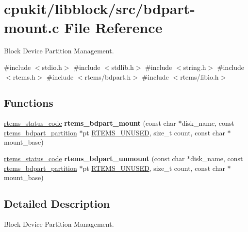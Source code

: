 \hypertarget{bdpart-mount_8c}{}\section{cpukit/libblock/src/bdpart-\/mount.c File Reference}
\label{bdpart-mount_8c}


Block Device Partition Management.  


{\ttfamily \#include $<$stdio.\+h$>$}\newline
{\ttfamily \#include $<$stdlib.\+h$>$}\newline
{\ttfamily \#include $<$string.\+h$>$}\newline
{\ttfamily \#include $<$rtems.\+h$>$}\newline
{\ttfamily \#include $<$rtems/bdpart.\+h$>$}\newline
{\ttfamily \#include $<$rtems/libio.\+h$>$}\newline
\subsection*{Functions}
\begin{DoxyCompactItemize}
\item 
\mbox{\label{bdpart-mount_8c_a652c94c1ca0ff28d1d81aef4ba893453}} 
\mbox{\hyperlink{group__ClassicStatus_ga545d41846817eaba6143d52ee4d9e9fe}{rtems\+\_\+status\+\_\+code}} {\bfseries rtems\+\_\+bdpart\+\_\+mount} (const char $\ast$disk\+\_\+name, const \mbox{\hyperlink{structrtems__bdpart__partition}{rtems\+\_\+bdpart\+\_\+partition}} $\ast$pt \mbox{\hyperlink{group__RTEMSScoreBaseDefs_ga6794c0ff237a90e837e19f9bbcae4297}{R\+T\+E\+M\+S\+\_\+\+U\+N\+U\+S\+ED}}, size\+\_\+t count, const char $\ast$mount\+\_\+base)
\item 
\mbox{\label{bdpart-mount_8c_ae3d25c086e88fbe6740f46a74e2afe2a}} 
\mbox{\hyperlink{group__ClassicStatus_ga545d41846817eaba6143d52ee4d9e9fe}{rtems\+\_\+status\+\_\+code}} {\bfseries rtems\+\_\+bdpart\+\_\+unmount} (const char $\ast$disk\+\_\+name, const \mbox{\hyperlink{structrtems__bdpart__partition}{rtems\+\_\+bdpart\+\_\+partition}} $\ast$pt \mbox{\hyperlink{group__RTEMSScoreBaseDefs_ga6794c0ff237a90e837e19f9bbcae4297}{R\+T\+E\+M\+S\+\_\+\+U\+N\+U\+S\+ED}}, size\+\_\+t count, const char $\ast$mount\+\_\+base)
\end{DoxyCompactItemize}


\subsection{Detailed Description}
Block Device Partition Management. 

